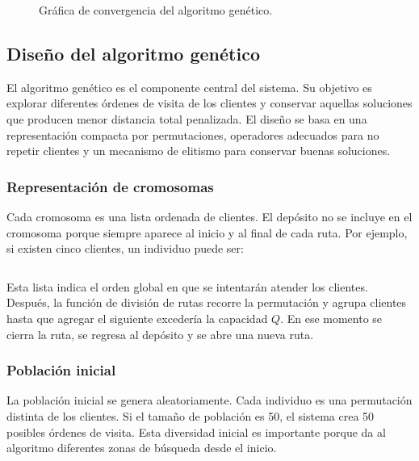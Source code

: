 \documentclass[runningheads]{llncs}
\begin{document}
\begin{figure}
\centering
{}
\caption{Gr\'afica de convergencia del algoritmo gen\'etico.}
\label{fig:convergencia}
\end{figure}

\subsection{Dise\~no del algoritmo gen\'etico}

El algoritmo gen\'etico es el componente central del sistema. Su objetivo es
explorar diferentes \'ordenes de visita de los clientes y conservar aquellas
soluciones que producen menor distancia total penalizada. El dise\~no se basa en
una representaci\'on compacta por permutaciones, operadores adecuados para no
repetir clientes y un mecanismo de elitismo para conservar buenas soluciones.

\subsubsection{Representaci\'on de cromosomas}
Cada cromosoma es una lista ordenada de clientes. El dep\'osito no se incluye en
el cromosoma porque siempre aparece al inicio y al final de cada ruta. Por
ejemplo, si existen cinco clientes, un individuo puede ser:

\begin{equation}
[4, 1, 3, 5, 2]
\end{equation}

Esta lista indica el orden global en que se intentar\'an atender los clientes.
Despu\'es, la funci\'on de divisi\'on de rutas recorre la permutaci\'on y agrupa
clientes hasta que agregar el siguiente exceder\'ia la capacidad $Q$. En ese
momento se cierra la ruta, se regresa al dep\'osito y se abre una nueva ruta.

\subsubsection{Poblaci\'on inicial}
La poblaci\'on inicial se genera aleatoriamente. Cada individuo es una permutaci\'on
distinta de los clientes. Si el tama\~no de poblaci\'on es 50, el sistema crea 50
posibles \'ordenes de visita. Esta diversidad inicial es importante porque da al
algoritmo diferentes zonas de b\'usqueda desde el inicio.
\end{document}
